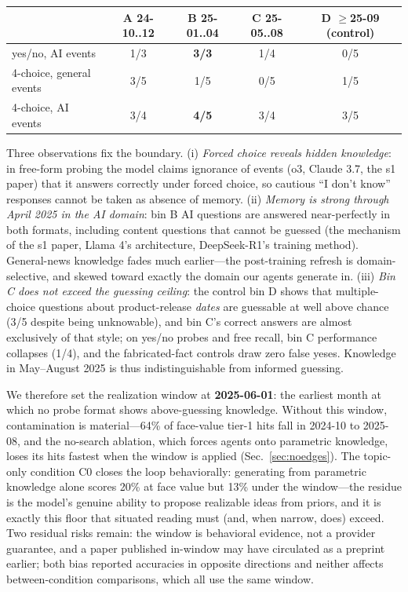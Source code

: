 \documentclass{article} %
\begin{document}
\begin{center}\small
\begin{tabular}{lcccc}
\toprule
 & \textbf{A} 24-10..12 & \textbf{B} 25-01..04 & \textbf{C} 25-05..08 &
 \textbf{D} $\geq$25-09 (control) \\
\midrule
yes/no, AI events & 1/3 & \textbf{3/3} & 1/4 & 0/5 \\
4-choice, general events & 3/5 & 1/5 & 0/5 & 1/5 \\
4-choice, AI events & 3/4 & \textbf{4/5} & 3/4 & 3/5 \\
\bottomrule
\end{tabular}
\end{center}

Three observations fix the boundary. (i) \emph{Forced choice reveals
hidden knowledge}: in free-form probing the model claims ignorance of
events (o3, Claude 3.7, the s1 paper) that it answers correctly under
forced choice, so cautious ``I don't know'' responses cannot be taken
as absence of memory. (ii) \emph{Memory is strong through April 2025
in the AI domain}: bin B AI questions are answered near-perfectly in
both formats, including content questions that cannot be guessed (the
mechanism of the s1 paper, Llama 4's architecture, DeepSeek-R1's
training method). General-news knowledge fades much earlier---the
post-training refresh is domain-selective, and skewed toward exactly
the domain our agents generate in. (iii) \emph{Bin C does not exceed
the guessing ceiling}: the control bin D shows that multiple-choice
questions about product-release \emph{dates} are guessable at well
above chance (3/5 despite being unknowable), and bin C's correct
answers are almost exclusively of that style; on yes/no probes and
free recall, bin C performance collapses (1/4), and the fabricated-fact
controls draw zero false yeses. Knowledge in May--August 2025 is thus
indistinguishable from informed guessing.

We therefore set the realization window at \textbf{2025-06-01}: the
earliest month at which no probe format shows above-guessing knowledge.
Without this window, contamination is material---64\% of face-value
tier-1 hits fall in 2024-10 to 2025-08, and the no-search ablation,
which forces agents onto parametric knowledge, loses its hits fastest
when the window is applied (Sec.~\ref{sec:noedges}). The topic-only condition C0 closes the loop behaviorally: generating
from parametric knowledge alone scores 20\% at face value but 13\%
under the window---the residue is the model's genuine ability to
propose realizable ideas from priors, and it is exactly this floor
that situated reading must (and, when narrow, does) exceed. Two
residual risks remain: the window is behavioral evidence, not a
provider guarantee, and a paper published in-window may have
circulated as a preprint earlier; both bias reported accuracies in
opposite directions and neither affects between-condition comparisons,
which all use the same window.
\end{document}
